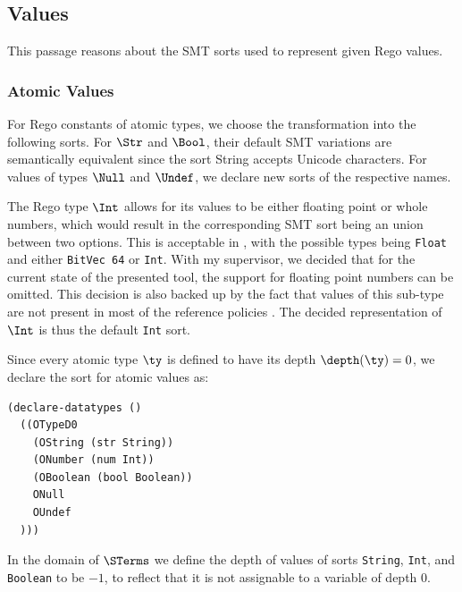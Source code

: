 \subsection{Values}

This passage reasons about the SMT sorts used to represent given Rego values.

\subsubsection{Atomic Values}

For Rego constants of atomic types, we choose the transformation into the following \smtlib sorts.
For $\Str$ and $\Bool$, their default SMT variations are semantically equivalent since the sort String accepts Unicode characters.
For values of types $\Null$ and $\Undef$, we declare new sorts of the respective names.

The Rego type $\Int$ allows for its values to be either floating point or whole numbers, which would result in the corresponding SMT sort being an union between two options.
This is acceptable in \smtlib, with the possible types being \texttt{Float} and either \texttt{BitVec 64} or \texttt{Int}.
With my supervisor, we decided that for the current state of the presented tool, the support for floating point numbers can be omitted.
This decision is also backed up by the fact that values of this sub-type are not present in most of the reference policies \cite{rego-policies:web}.
The decided representation of $\Int$ is thus the default \texttt{Int} sort.

Since every atomic type $\ty$ is defined to have its depth $\depth(\ty) = 0$, we declare the sort for atomic values as:
\begin{lstlisting}[language=SMT]
(declare-datatypes ()
  ((OTypeD0
    (OString (str String))
    (ONumber (num Int))
    (OBoolean (bool Boolean))
    ONull
    OUndef
  )))
\end{lstlisting}

In the domain of $\STerms$ we define the depth of values of sorts \texttt{String}, \texttt{Int}, and \texttt{Boolean} to be $-1$, to reflect that it is not assignable to a variable of depth $0$.

